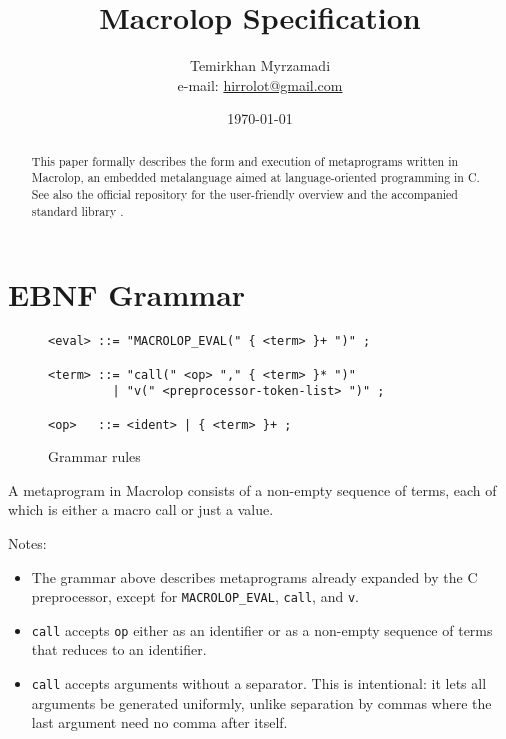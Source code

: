 \documentclass[12pt]{article}
\theoremstyle{break}
\begin{document}
\title{Macrolop Specification}
\date{\today}
\author{Temirkhan Myrzamadi \\ e-mail: \href{mailto:hirrolot@gmail.com}{hirrolot@gmail.com}}
\maketitle

\begin{abstract}
This paper formally describes the form and execution of metaprograms written in Macrolop,
an embedded metalanguage aimed at language-oriented programming in C. See also the official
repository \cite{Macrolop} for the user-friendly overview and the accompanied standard
library \cite{MacrolopDocs}.
\end{abstract}

\tableofcontents

\newpage

\section{EBNF Grammar}

\begin{figure}[H]
    \caption{Grammar rules}

\begin{verbatim}
<eval> ::= "MACROLOP_EVAL(" { <term> }+ ")" ;

<term> ::= "call(" <op> "," { <term> }* ")"
         | "v(" <preprocessor-token-list> ")" ;

<op>   ::= <ident> | { <term> }+ ;
\end{verbatim}

\end{figure}

A metaprogram in Macrolop consists of a non-empty sequence of terms, each of which
is either a macro call or just a value.

Notes:

\begin{itemize}
    \item The grammar above describes metaprograms already expanded by the C preprocessor,
    except for \texttt{MACROLOP\_EVAL}, \texttt{call}, and \texttt{v}.
    \item \texttt{call} accepts \texttt{op} either as an identifier or as a non-empty
    sequence of terms that reduces to an identifier.
    \item \texttt{call} accepts arguments without a separator. This is intentional: it lets
    all arguments be generated uniformly, unlike separation by commas where the last argument
    need no comma after itself.
\end{itemize}
\end{document}
